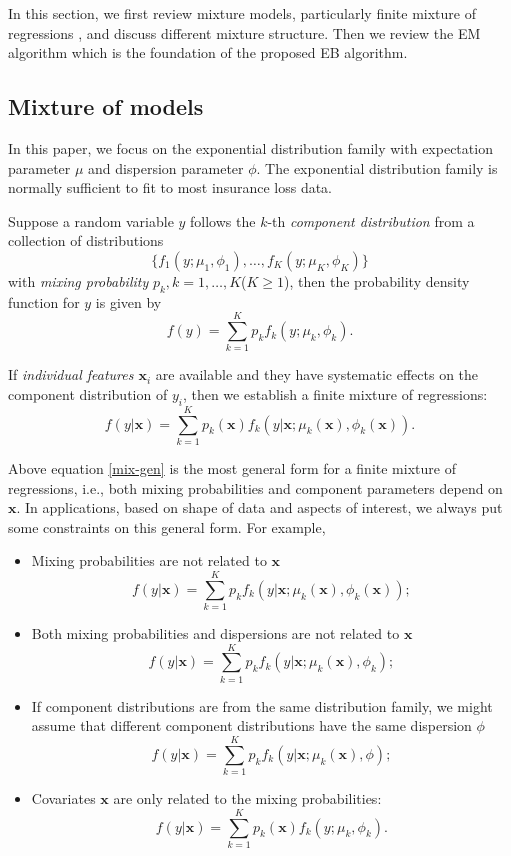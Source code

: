 \documentclass[11pt]{article}
\numberwithin{equation}{section}
\def\bx{\boldsymbol{x}}
\begin{document}
In this section, we first review mixture models, particularly finite mixture of regressions \citep{peel2000finite}, and discuss different mixture structure. 
Then we review the EM algorithm which is the foundation of the proposed EB algorithm. 


\subsection{Mixture of models}\label{review:mix1}
In this paper, we focus on the exponential distribution family with expectation parameter $\mu$ and dispersion parameter $\phi$. 
The exponential distribution family is normally sufficient to fit to most insurance loss data.

	Suppose a random variable $y$ follows the $k$-th {\it component distribution} from a collection of distributions
	$$\{f_1(y;\mu_1,\phi_1),\ldots,f_K(y;\mu_K,\phi_K)\}$$
	with \textit{mixing probability} $p_k, k=1,\ldots,K$($K \geqslant 1$),
	then the probability density function for $y$ is given by 
	$$f(y)=\sum_{k=1}^Kp_kf_k(y;\mu_k,\phi_k).$$

	If {\it individual features $\bx_i$} are available and they have systematic effects on the component distribution of $y_i$, then we establish a finite mixture of regressions:
	\begin{equation}\label{mix-gen}
		f(y|\bx)=\sum_{k=1}^Kp_k(\bx)f_k(y|\bx;\mu_k(\bx),\phi_k(\bx)).
	\end{equation}
	
	
	Above equation \eqref{mix-gen} is the most general form for a finite mixture of regressions, 
	i.e., both mixing probabilities and component parameters depend on $\bx$.
	 In applications,  based on  shape of data and  aspects of interest, we always put some constraints on this general form. For example,
	\begin{itemize}
		\item Mixing probabilities are not related to $\bx$
		$$f(y|\bx)=\sum_{k=1}^Kp_kf_k(y|\bx;\mu_k(\bx),\phi_k(\bx));$$
		\item Both mixing probabilities and dispersions are not related to $\bx$
		$$f(y|\bx)=\sum_{k=1}^Kp_kf_k(y|\bx;\mu_k(\bx),\phi_k);$$

		\item If component distributions are from the same distribution family, we might assume that different component distributions have the same dispersion $\phi$
		$$f(y|\bx)=\sum_{k=1}^Kp_kf_k(y|\bx;\mu_k(\bx),\phi);$$
		\item Covariates $\bx$ are only related to the mixing probabilities:
		$$f(y|\bx)=\sum_{k=1}^Kp_k(\bx)f_k(y;\mu_k,\phi_k).$$
	\end{itemize}
	
\end{document}
